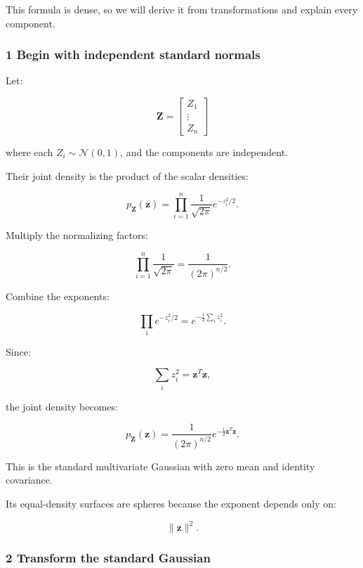 This formula is dense, so we will derive it from transformations and explain every component.

\subsubsection{1 Begin with independent standard normals}\label{02-foundations-ii-ch024-begin-with-independent-standard-normals}

\hypertarget{02-foundations-ii-ch024-begin-with-independent-standard-normals}{}

Let:

\[
 \mathbf Z= \begin{bmatrix} Z_1\\ \vdots\\ Z_n \end{bmatrix}
\]

where each \(Z_i\sim\mathcal N(0,1)\), and the components are independent.

Their joint density is the product of the scalar densities:

\[
 p_{\mathbf Z}(\mathbf z)= \prod_{i=1}^{n} \frac1{\sqrt{2\pi}}e^{-z_i^2/2}.
\]

Multiply the normalizing factors:

\[
 \prod_{i=1}^{n}\frac1{\sqrt{2\pi}} = \frac1{(2\pi)^{n/2}}.
\]

Combine the exponents:

\[
 \prod_i e^{-z_i^2/2} = e^{-\frac12\sum_i z_i^2}.
\]

Since:

\[
 \sum_i z_i^2=\mathbf z^T\mathbf z,
\]

the joint density becomes:

\[
 \boxed{ p_{\mathbf Z}(\mathbf z)= \frac1{(2\pi)^{n/2}} e^{-\frac12\mathbf z^T\mathbf z} }.
\]

This is the standard multivariate Gaussian with zero mean and identity covariance.

Its equal-density surfaces are spheres because the exponent depends only on:

\[
 \|\mathbf z\|^2.
\]

\subsubsection{2 Transform the standard Gaussian}\label{02-foundations-ii-ch024-transform-the-standard-gaussian}

\hypertarget{02-foundations-ii-ch024-transform-the-standard-gaussian}{}

